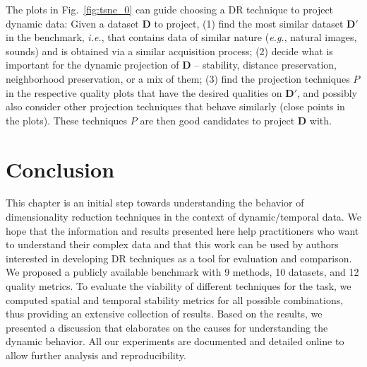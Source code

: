 

The plots in Fig.~\ref{fig:tsne_0} can guide choosing a DR technique to project dynamic data: Given a dataset $\mathbf{D}$ to project, (1) find the most similar dataset $\mathbf{D}'$ in the benchmark, \emph{i.e.}, that contains data of similar nature (\emph{e.g.}, natural images, sounds) and is obtained via a similar acquisition process; (2) decide what is important for the dynamic projection of $\mathbf{D}$ -- stability, distance preservation, neighborhood preservation, or a mix of them; (3) find the projection techniques $P$ in the respective quality plots that have the desired qualities on $\mathbf{D}'$, and possibly also consider other projection techniques that behave similarly (close points in the plots). These techniques $P$ are then good candidates to project $\mathbf{D}$ with.

\section{Conclusion}
\label{sec:conclusion}
%
This chapter is an initial step towards understanding the behavior of dimensionality reduction techniques in the context of dynamic/temporal data. We hope that the information and results presented here help practitioners who want to understand their complex data and that this work can be used by authors interested in developing DR techniques as a tool for evaluation and comparison.
We proposed a publicly available benchmark with 9 methods, 10 datasets, and 12 quality metrics. To evaluate the viability of different techniques for the task, we computed spatial and temporal stability metrics for all possible combinations, thus providing an extensive collection of results. Based on the results, we presented a discussion that elaborates on the causes for understanding the dynamic behavior. All our experiments are documented and detailed online \citep{repo} to allow further analysis and reproducibility.

